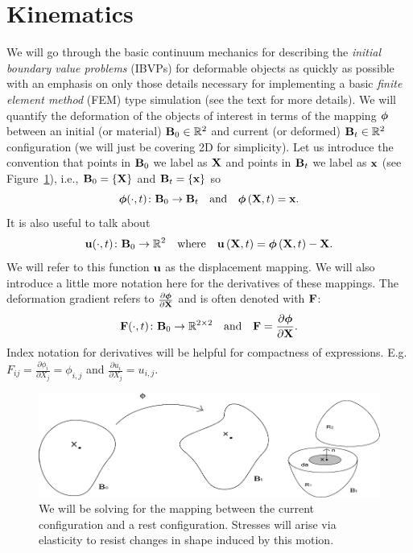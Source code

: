 
\section{Kinematics}

We will go through the basic continuum mechanics for describing the \emph{initial boundary value problems} (IBVPs) for deformable objects as quickly as possible with an emphasis on only those details necessary for implementing a basic \emph{finite element method} (FEM) type simulation (see the text \cite{Bonet_Wood_2008} for more details). We will quantify the deformation of the objects of interest in terms of the mapping $\boldsymbol{\phi}$ between an initial (or material) $\mathbf{B}_0 \in \mathbb{R}^2$ and current (or deformed) $\mathbf{B}_t \in \mathbb{R}^2$ configuration (we will just be covering 2D for simplicity). Let us introduce the convention that points in $\mathbf{B}_0$ we label as $\mathbf{X}$ and points in $\mathbf{B}_t$ we label as $\mathbf{x}$ (see Figure~\ref{fig:phi}), i.e., $\mathbf{B}_0 = \left\{ \mathbf{X} \right\}$ and $\mathbf{B}_t = \left\{ \mathbf{x} \right\}$ so
\begin{equation*}
\boldsymbol{\phi}(\cdot,t) \colon \mathbf{B}_0 \to \mathbf{B}_t \quad \text{and} \quad \boldsymbol{\phi} \left( \mathbf{X}, t \right) = \mathbf{x}.
\end{equation*}
It is also useful to talk about
\begin{equation*}
\mathbf{u}(\cdot,t) \colon \mathbf{B}_0 \to \mathbb{R}^2 \quad \text{where} \quad \mathbf{u} \left( \mathbf{X}, t \right) = \boldsymbol{\phi} \left( \mathbf{X}, t \right) - \mathbf{X}.
\end{equation*}
We will refer to this function $\mathbf{u}$ as the displacement mapping. We will also introduce a little more notation here for the derivatives of these mappings. The deformation gradient refers to $\frac{\partial\boldsymbol{\phi}}{\partial\mathbf{X}}$ and is often denoted with $\mathbf{F}$:
\begin{equation*}
\mathbf{F}(\cdot,t) \colon \mathbf{B}_0 \to \mathbb{R}^{2\times2} \quad \text{and} \quad \mathbf{F} = \frac{\partial\boldsymbol{\phi}}{\partial\mathbf{X}}.
\end{equation*}
Index notation for derivatives will be helpful for compactness of expressions. E.g. $F_{ij} = \frac{\partial\phi_i}{\partial X_j} = \phi_{i,j}$ and $\frac{\partial u_i}{\partial X_j} = u_{i,j}$.
\begin{figure}
\includegraphics[width=\textwidth]{images/continuum}
\caption{We will be solving for the mapping between the current configuration and a rest configuration. Stresses will arise via elasticity to resist changes in shape induced by this motion.}
\label{fig:phi}
\end{figure}

